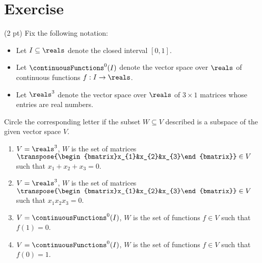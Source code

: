 %
%
\section{Exercise}

(2 pt) Fix the following notation:
\begin{itemize}
\item Let $I \subseteq \reals$ denote the closed interval $[0,1]$.
\item Let $\continuousFunctions^{0}(I)$ denote the vector space over $\reals$ of continuous functions $f : I \rightarrow \reals$.
\item Let $\reals^{3}$ denote the vector space over $\reals$ of $3 \times 1$ matrices whose entries are real numbers.
\end{itemize}
Circle the corresponding letter if the subset $W \subseteq V$ described is a subspace of the given vector space $V$.
\begin{enumerate}[label=(\alph*)]
\item\label{itm : Quiz11 R3 Entries Add To 0} $V = \reals^{3}$, $W$ is the set of matrices $\transpose{\begin{bmatrix}x_{1}&x_{2}&x_{3}\end{bmatrix}} \in V$ such that $x_{1} + x_{2} + x_{3} = 0$.
\item\label{itm : Quiz11 R3 Entries Multiply To 0} $V = \reals^{3}$, $W$ is the set of matrices $\transpose{\begin{bmatrix}x_{1}&x_{2}&x_{3}\end{bmatrix}} \in V$ such that $x_{1} x_{2} x_{3} = 0$.
\item\label{itm : Quiz11 f(1)=0} $V = \continuousFunctions^{0}(I)$, $W$ is the set of functions $f \in V$ such that $f(1) = 0$.
\item\label{itm : Quiz11 f(0)=1} $V = \continuousFunctions^{0}(I)$, $W$ is the set of functions $f \in V$ such that $f(0) = 1$.
\end{enumerate}

